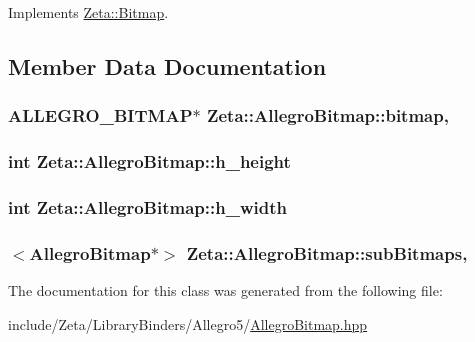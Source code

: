 Implements \hyperlink{classZeta_1_1Bitmap_afc49ceff653f55699fe7b723eb6193ae}{Zeta\+::\+Bitmap}.



\subsection{Member Data Documentation}
\hypertarget{classZeta_1_1AllegroBitmap_aec65e1335da328dd4d7964e97297ea72}{
\subsubsection[{bitmap}]{\setlength{\rightskip}{0pt plus 5cm}A\+L\+L\+E\+G\+R\+O\+\_\+\+B\+I\+T\+M\+A\+P$\ast$ Zeta\+::\+Allegro\+Bitmap\+::bitmap\hspace{0.3cm}{\ttfamily [mutable]}, {\ttfamily [private]}}}\label{classZeta_1_1AllegroBitmap_aec65e1335da328dd4d7964e97297ea72}
\hypertarget{classZeta_1_1AllegroBitmap_aca7f1a2bb6f23d51235f04dfba1ebbfb}{
\subsubsection[{h\+\_\+height}]{\setlength{\rightskip}{0pt plus 5cm}int Zeta\+::\+Allegro\+Bitmap\+::h\+\_\+height\hspace{0.3cm}{\ttfamily [private]}}}\label{classZeta_1_1AllegroBitmap_aca7f1a2bb6f23d51235f04dfba1ebbfb}
\hypertarget{classZeta_1_1AllegroBitmap_a223f2bc3bdc93e0d8195bd29bcaadbc7}{
\subsubsection[{h\+\_\+width}]{\setlength{\rightskip}{0pt plus 5cm}int Zeta\+::\+Allegro\+Bitmap\+::h\+\_\+width\hspace{0.3cm}{\ttfamily [private]}}}\label{classZeta_1_1AllegroBitmap_a223f2bc3bdc93e0d8195bd29bcaadbc7}
\hypertarget{classZeta_1_1AllegroBitmap_ac12c67de5ad5f7e08ec77bff1def3e15}{
\subsubsection[{sub\+Bitmaps}]{$<${\bf Allegro\+Bitmap}$\ast$$>$ Zeta\+::\+Allegro\+Bitmap\+::sub\+Bitmaps\hspace{0.3cm}{\ttfamily [mutable]}, {\ttfamily [private]}}}\label{classZeta_1_1AllegroBitmap_ac12c67de5ad5f7e08ec77bff1def3e15}


The documentation for this class was generated from the following file\+:\begin{DoxyCompactItemize}
\item 
include/\+Zeta/\+Library\+Binders/\+Allegro5/\hyperlink{AllegroBitmap_8hpp}{Allegro\+Bitmap.\+hpp}\end{DoxyCompactItemize}
